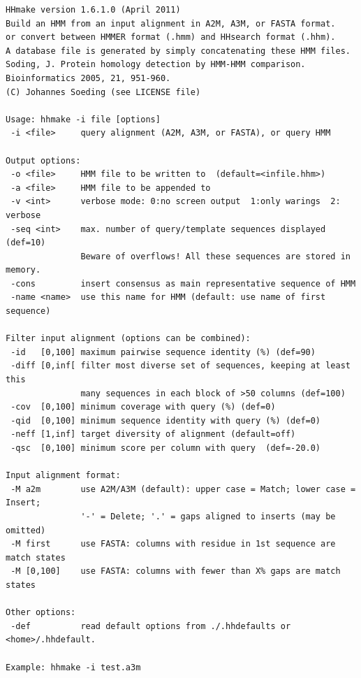 \documentclass[11pt,a4paper]{article}
\begin{document}
\small \begin{verbatim}
HHmake version 1.6.1.0 (April 2011)
Build an HMM from an input alignment in A2M, A3M, or FASTA format.   
or convert between HMMER format (.hmm) and HHsearch format (.hhm).   
A database file is generated by simply concatenating these HMM files.
Soding, J. Protein homology detection by HMM-HMM comparison. Bioinformatics 2005, 21, 951-960.
(C) Johannes Soeding (see LICENSE file)

Usage: hhmake -i file [options]                                       
 -i <file>     query alignment (A2M, A3M, or FASTA), or query HMM         

Output options:                                                           
 -o <file>     HMM file to be written to  (default=<infile.hhm>)          
 -a <file>     HMM file to be appended to                                 
 -v <int>      verbose mode: 0:no screen output  1:only warings  2: verbose
 -seq <int>    max. number of query/template sequences displayed (def=10)  
               Beware of overflows! All these sequences are stored in memory.
 -cons         insert consensus as main representative sequence of HMM 
 -name <name>  use this name for HMM (default: use name of first sequence)   

Filter input alignment (options can be combined):                         
 -id   [0,100] maximum pairwise sequence identity (%) (def=90)   
 -diff [0,inf[ filter most diverse set of sequences, keeping at least this    
               many sequences in each block of >50 columns (def=100)
 -cov  [0,100] minimum coverage with query (%) (def=0) 
 -qid  [0,100] minimum sequence identity with query (%) (def=0) 
 -neff [1,inf] target diversity of alignment (default=off)
 -qsc  [0,100] minimum score per column with query  (def=-20.0)

Input alignment format:                                                    
 -M a2m        use A2M/A3M (default): upper case = Match; lower case = Insert;
               '-' = Delete; '.' = gaps aligned to inserts (may be omitted)   
 -M first      use FASTA: columns with residue in 1st sequence are match states
 -M [0,100]    use FASTA: columns with fewer than X% gaps are match states   

Other options:                                                               
 -def          read default options from ./.hhdefaults or <home>/.hhdefault. 

Example: hhmake -i test.a3m 
\end{verbatim} \normalsize
\end{document}
